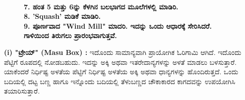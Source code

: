 \begin{figure}[H]
\\
\textbf{7. ಹಂತ 5 ಮತ್ತು 6ನ್ನು ಕೆಳಗಿನ ಬಲಭಾಗದ ಮೂಲೆಗಳಲ್ಲಿ ಮಾಡಿರಿ.}\\
\textbf{8. 'Squash' ಮಡಿಕೆ ಮಾಡಿರಿ.}\\
\textbf{9. ಪೂರ್ಣವಾದ "Wind Mill" ಮಾದರಿ. ಇದನ್ನು ಒಂದು ಆಧಾರಕ್ಕೆ ಸೇರಿಸಿದರೆ. ಗಾಳಿಯಿಂದ ತಿರುಗಲು ಪ್ರಾರಂಭವಾಗುತ್ತವೆ.}
\end{figure}

\noindent
\textbf{(i) "ಟ್ರೇಯ್" (Masu Box) : } ಇದೊಂದು ಸಾಮಾನ್ಯವಾಗಿ ಪ್ರಾಯೋಗಿಕ ಓರಿಗಾಮಿ ಆಗಿದೆ. ಇದೊಂದು ಪೆಟ್ಟಿಗೆ ರೂಪದಲ್ಲಿ ನೋಡಬಹುದು. ಇದನ್ನು ಅಕ್ಕಿ ಅಥವಾ ಇತರೇ\break ದಾನ್ಯಗಳನ್ನು ಅಳತೆ ಮಾಡಲು ಬಳಸುತ್ತಾರೆ. ಯಾಕೆಂದರೆ ನಿರ್ಧಿಷ್ಟ ಅಳತೆಯ ಪೆಟ್ಟಿಗೆ ನಿರ್ಧಿಷ್ಟ ಅಳತೆಯ ಅಕ್ಕಿ ಅಥವಾ ಧಾನ್ಯಗಳನ್ನು ಹೊಂದಿರುತ್ತದೆ. ಒಂದು ಬದಿಯಲ್ಲಿ ದಟ್ಟ ಬಣ್ಣ ಹಾಗೂ \hbox{ಇನ್ನೊಂದು} ಬದಿಯಲ್ಲಿ ತೆಳುಬಣ್ಣದ ಚೌಕಾಕಾರದ ಕಾಗದವನ್ನು ಉಪಯೋಗಿಸಿ ತಯಾರಿಸುತ್ತಾರೆ.
\begin{figure}[H]
\end{figure}

